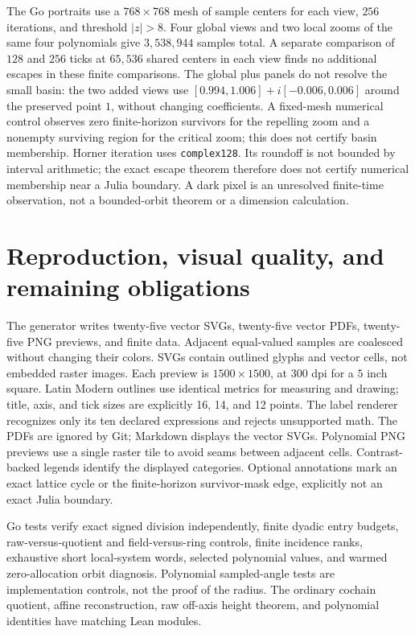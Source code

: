 \documentclass[11pt,letterpaper]{article}
\begin{document}
The Go portraits use a \(768\times768\) mesh of sample centers for each view, \(256\) iterations, and threshold \(|z|>8\). Four global views and two local zooms of the same four polynomials give \(3,538,944\) samples total. A separate comparison of \(128\) and \(256\) ticks at \(65,536\) shared centers in each view finds no additional escapes in these finite comparisons. The global plus panels do not resolve the small basin: the two added views use \([0.994,1.006]+i[-0.006,0.006]\) around the preserved point \(1\), without changing coefficients. A fixed-mesh numerical control observes zero finite-horizon survivors for the repelling zoom and a nonempty surviving region for the critical zoom; this does not certify basin membership. Horner iteration uses \texttt{complex128}. Its roundoff is not bounded by interval arithmetic; the exact escape theorem therefore does not certify numerical membership near a Julia boundary. A dark pixel is an unresolved finite-time observation, not a bounded-orbit theorem or a dimension calculation.

\section{Reproduction, visual quality, and remaining obligations}

The generator writes twenty-five vector SVGs, twenty-five vector PDFs, twenty-five PNG previews, and finite data. Adjacent equal-valued samples are coalesced without changing their colors. SVGs contain outlined glyphs and vector cells, not embedded raster images. Each preview is \(1500\times1500\), at 300 dpi for a \(5\) inch square. Latin Modern outlines use identical metrics for measuring and drawing; title, axis, and tick sizes are explicitly 16, 14, and 12 points. The label renderer recognizes only its ten declared expressions and rejects unsupported math. The PDFs are ignored by Git; Markdown displays the vector SVGs. Polynomial PNG previews use a single raster tile to avoid seams between adjacent cells. Contrast-backed legends identify the displayed categories. Optional annotations mark an exact lattice cycle or the finite-horizon survivor-mask edge, explicitly not an exact Julia boundary.

Go tests verify exact signed division independently, finite dyadic entry budgets, raw-versus-quotient and field-versus-ring controls, finite incidence ranks, exhaustive short local-system words, selected polynomial values, and warmed zero-allocation orbit diagnosis. Polynomial sampled-angle tests are implementation controls, not the proof of the radius. The ordinary cochain quotient, affine reconstruction, raw off-axis height theorem, and polynomial identities have matching Lean modules.
\end{document}
